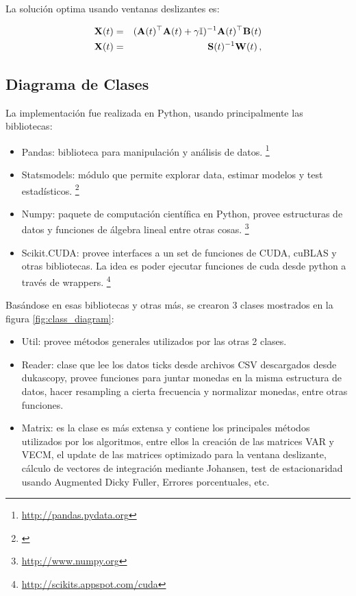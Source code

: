 La solución optima usando ventanas deslizantes es:

\begin{eqnarray}
\label{eq:optsolSLAAR}
\mathbf{X}(t)&=&({\bf A}(t)^\top{\bf A}(t)+
\gamma \mathbb{I})^{-1}{\bf A}(t)^\top{\bf B}(t) \\
\mathbf{X}(t)&=&\mathbf{S}(t)^{-1} \mathbf{W}(t) \, ,
\end{eqnarray}



\subsection{Diagrama de Clases}
La implementación fue realizada en Python, usando principalmente las bibliotecas:
\begin{itemize}
 \item Pandas: biblioteca para manipulación y análisis de datos. \footnote{\url{http://pandas.pydata.org}}
 \item Statsmodels: módulo que permite explorar data, estimar modelos y test
estadísticos. \footnote{\url{}}
 \item Numpy: paquete de computación científica en Python, provee estructuras
de datos y funciones de álgebra lineal entre otras cosas.
\footnote{\url{http://www.numpy.org}}
 \item Scikit.CUDA: provee interfaces a un set de funciones de CUDA, cuBLAS y
otras bibliotecas. La idea es poder ejecutar funciones de cuda desde python a
través de wrappers. \footnote{\url{http://scikits.appspot.com/cuda}}
\end{itemize}

Basándose en esas bibliotecas y otras más, se crearon 3 clases mostrados en la
figura \ref{fig:class_diagram}:
\begin{itemize}
 \item Util: provee métodos generales utilizados por las otras 2 clases.
 \item Reader: clase que lee los datos ticks desde archivos CSV descargados
desde dukascopy, provee funciones para juntar monedas en la misma estructura de
datos, hacer resampling a cierta frecuencia y normalizar monedas, entre otras
funciones.
 \item Matrix: es la clase es más extensa y contiene los principales métodos
utilizados por los algoritmos, entre ellos la creación de las matrices VAR y
VECM, el update de las matrices optimizado para la ventana deslizante, cálculo
de vectores de integración mediante Johansen, test de estacionaridad usando
Augmented Dicky Fuller, Errores porcentuales, etc.
\end{itemize}

